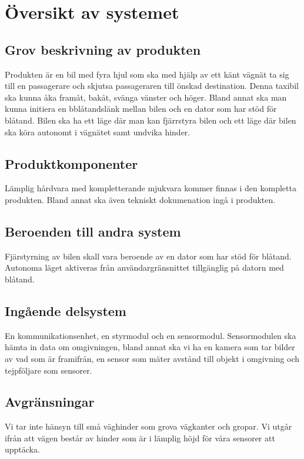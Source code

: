 \documentclass[krav.tex]{subfiles}
\begin{document}
\section{Översikt av systemet}

\subsection{Grov beskrivning av produkten}
Produkten är en bil med fyra hjul som ska med hjälp av ett känt vägnät ta sig till en passagerare och skjutsa
passageraren till önskad destination. Denna taxibil ska kunna åka framåt, bakåt, svänga vänster och höger.
Bland annat ska man kunna initiera en bblåtandslänk mellan bilen och en dator som har stöd för blåtand. Bilen ska ha ett läge
där man kan fjärrstyra bilen och ett läge där bilen ska köra autonomt i vägnätet samt undvika hinder.


\subsection{Produktkomponenter}
Lämplig hårdvara med kompletterande mjukvara kommer finnas i den kompletta produkten.
Bland annat ska även tekniskt dokumenation ingå i produkten.

\subsection{Beroenden till andra system}
Fjärstyrning av bilen skall vara beroende av en dator som har stöd för blåtand.
Autonoma läget aktiveras från användargränsnittet tillgänglig på datorn med blåtand.

\subsection{Ingående delsystem}
En kommunikationsenhet, en styrmodul och en sensormodul.
Sensormodulen ska hämta in data om omgivningen, bland annat ska vi 
ha en kamera som tar bilder av vad som är framifrån, en sensor som mäter
avstånd till objekt i omgivning och tejpföljare som sensorer.
\subsection{Avgränsningar}
Vi tar inte hänsyn till små väghinder som grova vägkanter och gropar.
Vi utgår ifrån att vägen består av hinder som är i lämplig höjd för våra sensorer att
upptäcka. 
\end{document}
